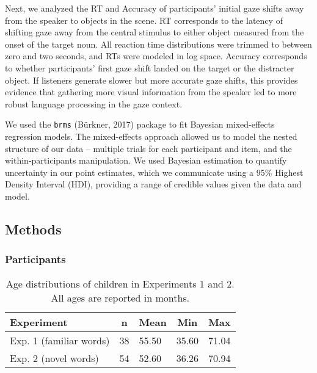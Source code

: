 \documentclass[10pt, letterpaper]{article}
\begin{document}
Next, we analyzed the RT and Accuracy of participants' initial gaze
shifts away from the speaker to objects in the scene. RT corresponds to
the latency of shifting gaze away from the central stimulus to either
object measured from the onset of the target noun. All reaction time
distributions were trimmed to between zero and two seconds, and RTs were
modeled in log space. Accuracy corresponds to whether participants'
first gaze shift landed on the target or the distracter object. If
listeners generate slower but more accurate gaze shifts, this provides
evidence that gathering more visual information from the speaker led to
more robust language processing in the gaze context.

We used the \texttt{brms} (Bürkner, 2017) package to fit Bayesian
mixed-effects regression models. The mixed-effects approach allowed us
to model the nested structure of our data -- multiple trials for each
participant and item, and the within-participants manipulation. We used
Bayesian estimation to quantify uncertainty in our point estimates,
which we communicate using a 95\% Highest Density Interval (HDI),
providing a range of credible values given the data and model.

\hypertarget{methods}{%
\subsection{Methods}\label{methods}}

\hypertarget{participants}{%
\subsubsection{Participants}\label{participants}}

\begin{table}[tbp]
\begin{center}
\begin{threeparttable}
\caption{\label{tab:make-ss-table}Age distributions of children in Experiments 1 and 2. All ages are reported in months.}
\begin{tabular}{lllll}
\toprule
Experiment & \multicolumn{1}{c}{n} & \multicolumn{1}{c}{Mean} & \multicolumn{1}{c}{Min} & \multicolumn{1}{c}{Max}\\
\midrule
Exp. 1 (familiar words) & 38 & 55.50 & 35.60 & 71.04\\
Exp. 2 (novel words) & 54 & 52.60 & 36.26 & 70.94\\
\bottomrule
\end{tabular}
\end{threeparttable}
\end{center}
\end{table}
\end{document}
